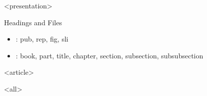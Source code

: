 \mode
<presentation>

\begin{frame}{Headings and Files}
  \label{manual:haf}

  \begin{block}{}
    }
  \end{block}

  \begin{block}{}
    }
  \end{block}

  \scriptsize{
    \begin{itemize}
       \item{}: pub, rep, fig, sli
  
       \item{}: book, part, title, chapter, section, subsection, subsubsection
    \end{itemize}
  }

\end{frame}


\mode
<article>

\bigskip


\clearpage

\mode
<all>
